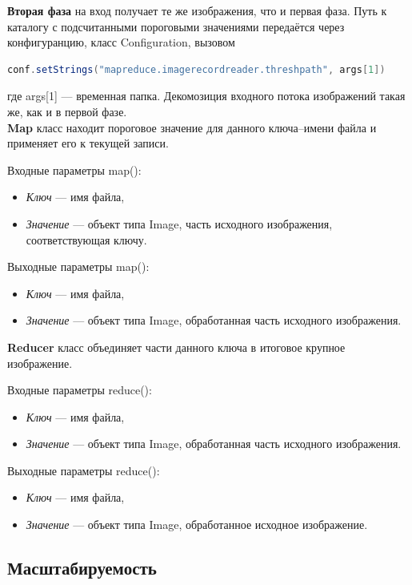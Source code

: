 \documentclass[12pt,a4paper]{extarticle} %
\begin{document}
 \textbf{Вторая фаза} на вход получает те же изображения, что и первая фаза. Путь к каталогу с подсчитанными пороговыми значениями передаётся через конфигуранцию, класс Configuration, вызовом
 \begin{lstlisting}[language=Java]
    conf.setStrings("mapreduce.imagerecordreader.threshpath", args[1]) 
\end{lstlisting}
где args[1] --- временная папка. Декомозиция входного потока изображений такая же, как и в первой фазе.\\[5pt]

    \noindent \textbf{Map} класс находит пороговое значение для данного ключа--имени файла и применяет его к текущей записи.

    \noindent Входные параметры map():
    \begin{itemize}
        \item[] \textit{Ключ} --- имя файла,
        \item[] \textit{Значение} --- объект типа Image, часть исходного изображения, соответствующая ключу.
    \end{itemize}

    \noindent Выходные параметры map():
    \begin{itemize}
        \item[] \textit{Ключ} --- имя файла,
        \item[] \textit{Значение} --- объект типа Image, обработанная часть исходного изображения.
    \end{itemize}

    \noindent \textbf{Reducer} класс объединяет части  данного ключа в итоговое крупное изображение. 

    \noindent Входные параметры reduce():
    \begin{itemize}
        \item[] \textit{Ключ} --- имя файла,
        \item[] \textit{Значение} --- объект типа Image, обработанная часть исходного изображения.
    \end{itemize}

    \noindent Выходные параметры reduce():
    \begin{itemize}
        \item[] \textit{Ключ} --- имя файла,
        \item[] \textit{Значение} --- объект типа Image, обработанное исходное изображение.
    \end{itemize}

\subsection{Масштабируемость}
\end{document}
